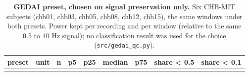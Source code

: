 \documentclass[11pt,a4paper]{article}
\begin{document}
\begin{longtable}[]{@{}
  >{\raggedright\arraybackslash}p{}
  >{\raggedright\arraybackslash}p{}
  >{\raggedright\arraybackslash}p{}
  >{\raggedright\arraybackslash}p{}
  >{\raggedright\arraybackslash}p{}
  >{\raggedright\arraybackslash}p{}
  >{\raggedright\arraybackslash}p{}
  >{\raggedright\arraybackslash}p{}
  >{\raggedright\arraybackslash}p{}@{}}
\caption{\textbf{GEDAI preset, chosen on signal preservation only.} Six CHB-MIT subjects (chb01, chb03, chb05, chb08, chb12, chb15), the same windows under both presets. Power kept per recording and per window (relative to the same 0.5 to 40 Hz signal); no classification result was used for the choice (\nolinkurl{src/gedai_qc.py}).}\tabularnewline
\toprule\noalign{}
\begin{minipage}[b]{\linewidth}\raggedright
preset
\end{minipage} & \begin{minipage}[b]{\linewidth}\raggedright
unit
\end{minipage} & \begin{minipage}[b]{\linewidth}\raggedright
n
\end{minipage} & \begin{minipage}[b]{\linewidth}\raggedright
p5
\end{minipage} & \begin{minipage}[b]{\linewidth}\raggedright
p25
\end{minipage} & \begin{minipage}[b]{\linewidth}\raggedright
median
\end{minipage} & \begin{minipage}[b]{\linewidth}\raggedright
p75
\end{minipage} & \begin{minipage}[b]{\linewidth}\raggedright
share \textless{} 0.5
\end{minipage} & \begin{minipage}[b]{\linewidth}\raggedright
share \textless{} 0.1
\end{minipage} \\
\midrule\noalign{}
\endfirsthead
\toprule\noalign{}
\begin{minipage}[b]{\linewidth}\raggedright

\end{minipage}
\end{longtable}
\end{document}
